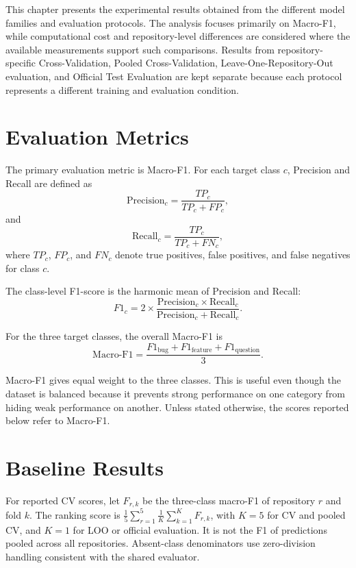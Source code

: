 This chapter presents the experimental results obtained from the different model families and evaluation protocols. The analysis focuses primarily on Macro-F1, while computational cost and repository-level differences are considered where the available measurements support such comparisons. Results from repository-specific Cross-Validation, Pooled Cross-Validation, Leave-One-Repository-Out evaluation, and Official Test Evaluation are kept separate because each protocol represents a different training and evaluation condition.

\section{Evaluation Metrics}
The primary evaluation metric is Macro-F1. For each target class $c$, Precision and Recall are defined as
\begin{equation}
    \text{Precision}_c = \frac{TP_c}{TP_c + FP_c},
\end{equation}
and
\begin{equation}
    \text{Recall}_c = \frac{TP_c}{TP_c + FN_c},
\end{equation}
where $TP_c$, $FP_c$, and $FN_c$ denote true positives, false positives, and false negatives for class $c$.

The class-level F1-score is the harmonic mean of Precision and Recall:
\begin{equation}
    F1_c = 2 \times \frac{\text{Precision}_c \times \text{Recall}_c}
    {\text{Precision}_c + \text{Recall}_c}.
\end{equation}

For the three target classes, the overall Macro-F1 is
\begin{equation}
    \text{Macro-F1} =
    \frac{F1_{\text{bug}} + F1_{\text{feature}} + F1_{\text{question}}}{3}.
\end{equation}

Macro-F1 gives equal weight to the three classes. This is useful even though the dataset is balanced because it prevents strong performance on one category from hiding weak performance on another. Unless stated otherwise, the scores reported below refer to Macro-F1.

\section{Baseline Results}
For reported CV scores, let $F_{r,k}$ be the three-class macro-F1 of repository $r$ and fold $k$. The ranking score is $\frac{1}{5}\sum_{r=1}^{5}\frac{1}{K}\sum_{k=1}^{K}F_{r,k}$, with $K=5$ for CV and pooled CV, and $K=1$ for LOO or official evaluation. It is not the F1 of predictions pooled across all repositories. Absent-class denominators use zero-division handling consistent with the shared evaluator.

